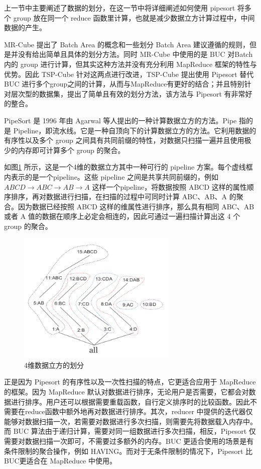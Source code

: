 上一节中主要阐述了数据的划分，在这一节中将详细阐述如何使用 pipesort 将多个 group 放在同一个 reduce 函数里计算，也就是减少数据立方计算过程中，中间数据的产生。 

MR-Cube 提出了 Batch Area 的概念和一些划分 Batch Area 建议遵循的规则，但是并没有给出简单且具体的划分方法。同时 MR-Cube 中使用的是 BUC 对Batch 内的 group 进行计算，但其实这种方法并没有充分利用 MapReduce 框架的特性与优势。因此 TSP-Cube 针对这两点进行改进，TSP-Cube 提出使用 Pipesort 替代 BUC 进行多个group之间的计算，从而与MapReduce有更好的结合；并且特别针对层次型的数据集，提出了简单且有效的划分方法，该方法与 Pipesort 有非常好的整合。

PipeSort\cite{agarwal1996computation} 是 1996 年由 Agarwal 等人提出的一种计算数据立方的方法。Pipe 指的是 Pipeline，即流水线。它是一种自顶向下的计算数据立方的方法。它利用数据的有序性以及多个 group 之间具有共同前缀的特性，对数据只扫描一遍并且使用极少的内存即可计算多个 group 的聚合。

如图\ref{pipesort} 所示，这是一个4维的数据立方其中一种可行的 pipeline 方案。每个虚线框内表示的是一个pipeline。这些 pipeline 之间是共享共同前缀的，例如 $ABCD\rightarrow ABC\rightarrow AB\rightarrow A$ 这样一个pipeline，将数据按照 ABCD 这样的属性顺序排序，再对数据进行扫描，在扫描的过程中可同时计算 ABC、AB、A 的聚合。因为数据已经按照 ABCD 这样的维属性进行排序，那么具有相同 ABC、AB 或者 A 值的数据在顺序上必定会相连的，因此可通过一遍扫描计算出这 4 个 group 的聚合。

\begin{figure}[!htb]
\centering\includegraphics[width=3in]{picture/ch_terasort_mr/pipesort} 
\caption{4维数据立方的划分}\label{pipesort} 
\end{figure} 

正是因为 Pipesort 的有序性以及一次性扫描的特点，它更适合应用于 MapReduce 的框架。因为 MapReduce 默认对数据进行排序，无论用户是否需要，它都会对数据进行排序。用户还可以根据需要重载函数，自行定义排序时的比较函数。因此不需要在reduce函数中额外地再对数据进行排序。其次，reducer 中提供的迭代器仅能够对数据扫描一次，若需要对数据进行多次扫描，则需要先将数据载入内存中。而 BUC 算法由于递归计算，需要对同一组数据进行多次扫描，相反，Pipesort 仅需要对数据扫描一次即可，不需要过多额外的内存。BUC 更适合使用的场景是有条件限制的聚合操作，例如 HAVING。而对于无条件限制的情况下，Pipesort 比 BUC更适合在 MapReduce 中使用。

